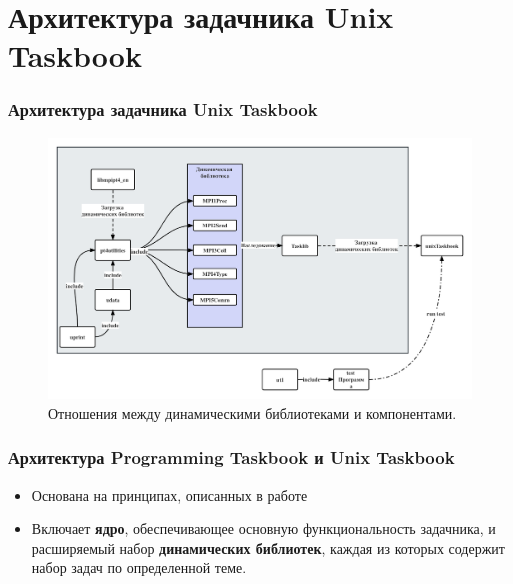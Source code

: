 \section{Архитектура задачника Unix Taskbook}

\begin{frame}
\frametitle{Архитектура задачника Unix Taskbook}


\begin{figure}[htbp]%
    \centering
    \includegraphics[width=0.8\linewidth]{images/arc.png}%
    \caption{Отношения между динамическими библиотеками и компонентами.}%
    \label{relation}%
\end{figure}

\end{frame}



\begin{frame}
\frametitle{Архитектура Programming Taskbook и Unix Taskbook}
\begin{itemize}
    \item Основана на принципах, описанных в работе \cite{ref3}
    \item Включает \textbf{ядро}, обеспечивающее основную функциональность задачника, и расширяемый набор \textbf{динамических библиотек}, 
    каждая из которых содержит набор задач по определенной теме.
\end{itemize}

\end{frame}

